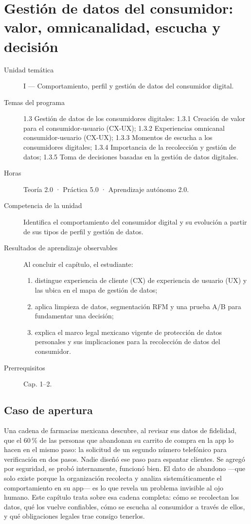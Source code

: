 \chapter{Gestión de datos del consumidor: valor, omnicanalidad, escucha y decisión}
\label{cap:03}

\begin{cajaFicha}
\begin{description}
  \item[Unidad temática] I — Comportamiento, perfil y gestión de datos del consumidor digital.
  \item[Temas del programa] 1.3 Gestión de datos de los consumidores digitales: 1.3.1 Creación de valor para el consumidor-usuario (CX-UX); 1.3.2 Experiencias omnicanal consumidor-usuario (CX-UX); 1.3.3 Momentos de escucha a los consumidores digitales; 1.3.4 Importancia de la recolección y gestión de datos; 1.3.5 Toma de decisiones basadas en la gestión de datos digitales.
  \item[Horas] Teoría 2.0 · Práctica 5.0 · Aprendizaje autónomo 2.0.
  \item[Competencia de la unidad] Identifica el comportamiento del consumidor digital y su evolución a partir de sus tipos de perfil y gestión de datos.
  \item[Resultados de aprendizaje observables] Al concluir el capítulo, el estudiante:
  \begin{enumerate}
    \item distingue experiencia de cliente (CX) de experiencia de usuario (UX) y las ubica en el mapa de gestión de datos;
    \item aplica limpieza de datos, segmentación RFM y una prueba A/B para fundamentar una decisión;
    \item explica el marco legal mexicano vigente de protección de datos personales y sus implicaciones para la recolección de datos del consumidor.
  \end{enumerate}
  \item[Prerrequisitos] Cap. 1--2.
\end{description}
\end{cajaFicha}

\section{Caso de apertura}

Una cadena de farmacias mexicana descubre, al revisar sus datos de
fidelidad, que el 60\,\% de las personas que abandonan su carrito de compra
en la app lo hacen en el mismo paso: la solicitud de un segundo número
telefónico para verificación en dos pasos. Nadie diseñó ese paso para
espantar clientes. Se agregó por seguridad, se probó internamente, funcionó
bien. El dato de abandono —que solo existe porque la organización recolecta
y analiza sistemáticamente el comportamiento en su app— es lo que revela un
problema invisible al ojo humano. Este capítulo trata sobre esa cadena
completa: cómo se recolectan los datos, qué los vuelve confiables, cómo se
escucha al consumidor a través de ellos, y qué obligaciones legales trae
consigo tenerlos.

